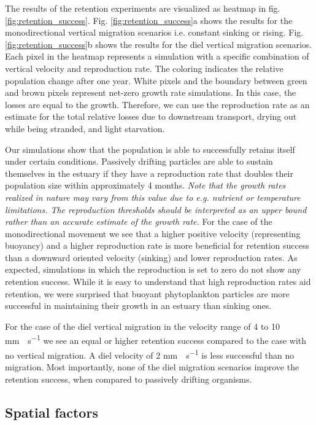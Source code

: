 \documentclass[npg, manuscript]{copernicus}
\begin{document}
The results of the retention experiments are visualized as heatmap in fig. \ref{fig:retention_success}.
Fig. \ref{fig:retention_success}a shows the results for the monodirectional vertical migration scenarios i.e. constant sinking or rising. Fig. \ref{fig:retention_success}b shows the results for the diel vertical migration scenarios. Each pixel in the heatmap represents a simulation with a specific combination of vertical velocity and reproduction rate. The coloring indicates the relative population change after one year. White pixels and the boundary between green and brown pixels represent net-zero growth rate simulations. In this case, the losses are equal to the growth. Therefore, we can use the reproduction rate as an estimate for the total relative losses due to downstream transport, drying out while being stranded, and light starvation.

Our simulations show that the population is able to successfully retains itself under certain conditions.
Passively drifting particles are able to sustain themselves in the estuary if they have a reproduction rate that doubles their population size within approximately 4 months.
\textit{
    Note that the growth rates realized in nature may vary from this value due to e.g. nutrient or temperature limitations. The reproduction thresholds should be interpreted as an upper bound rather than an accurate estimate of the growth rate.
}
For the case of the monodirectional movement we see that a higher positive velocity (representing buoyancy) and a higher reproduction rate is more beneficial for retention success than a downward oriented velocity (sinking) and lower reproduction rates.
As expected, simulations in which the reproduction is set to zero do not show any retention success.
While it is easy to understand that high reproduction rates aid retention, we were surprised that buoyant phytoplankton particles are more successful in maintaining their growth in an estuary than sinking ones.

For the case of the diel vertical migration in the velocity range of 4 to 10 \unit{mm\;s^{-1}} we see an equal or higher retention success compared to the case with no vertical migration.
A diel velocity of 2 \unit{mm\;s^{-1}} is less successful than no migration.
Most importantly, none of the diel migration scenarios improve the retention success, when compared to passively drifting organisms.


\subsection{Spatial factors}
\end{document}
